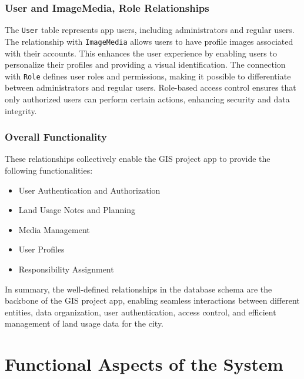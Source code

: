 \subsubsection{User and ImageMedia, Role Relationships}
The \texttt{User} table represents app users, including administrators and regular users. The relationship with \texttt{ImageMedia} allows users to have profile images associated with their accounts. This enhances the user experience by enabling users to personalize their profiles and providing a visual identification. The connection with \texttt{Role} defines user roles and permissions, making it possible to differentiate between administrators and regular users. Role-based access control ensures that only authorized users can perform certain actions, enhancing security and data integrity.

\subsubsection{Overall Functionality}
These relationships collectively enable the GIS project app to provide the following functionalities:

\begin{itemize}
    \item User Authentication and Authorization
    \item Land Usage Notes and Planning
    \item Media Management
    \item User Profiles
    \item Responsibility Assignment
\end{itemize}

In summary, the well-defined relationships in the database schema are the backbone of the GIS project app, enabling seamless interactions between different entities, data organization, user authentication, access control, and efficient management of land usage data for the city.


\section{Functional Aspects of the System}\label{sec:functional-aspects-of-the-system}
